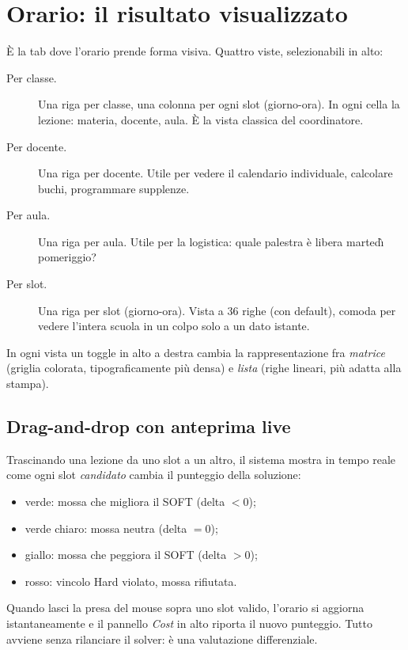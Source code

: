\section{Orario: il risultato visualizzato}
\label{sec:tab_orario}

\`E la tab dove l'orario prende forma visiva. Quattro viste,
selezionabili in alto:

\begin{description}
\item[Per classe.] Una riga per classe, una colonna per ogni
  slot (giorno-ora). In ogni cella la lezione: materia,
  docente, aula. \`E la vista classica del coordinatore.
\item[Per docente.] Una riga per docente. Utile per vedere il
  calendario individuale, calcolare buchi, programmare
  supplenze.
\item[Per aula.] Una riga per aula. Utile per la logistica:
  quale palestra \`e libera marted\`{\i} pomeriggio?
\item[Per slot.] Una riga per slot (giorno-ora). Vista a 36
  righe (con default), comoda per vedere l'intera scuola in un
  colpo solo a un dato istante.
\end{description}

In ogni vista un toggle in alto a destra cambia la
rappresentazione fra \emph{matrice} (griglia colorata,
tipograficamente pi\`u densa) e \emph{lista} (righe lineari, pi\`u
adatta alla stampa).

\subsection{Drag-and-drop con anteprima live}

Trascinando una lezione da uno slot a un altro, il sistema
mostra in tempo reale come ogni slot \emph{candidato} cambia
il punteggio della soluzione:

\begin{itemize}
\item \textcolor{cAllow}{verde}: mossa che migliora il SOFT
  (delta $< 0$);
\item verde chiaro: mossa neutra (delta $= 0$);
\item \textcolor{cSoft}{giallo}: mossa che peggiora il SOFT
  (delta $> 0$);
\item \textcolor{cHard}{rosso}: vincolo Hard violato, mossa
  rifiutata.
\end{itemize}

Quando lasci la presa del mouse sopra uno slot valido,
l'orario si aggiorna istantaneamente e il pannello \emph{Cost}
in alto riporta il nuovo punteggio. Tutto avviene senza
rilanciare il solver: \`e una valutazione differenziale.


